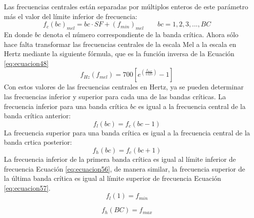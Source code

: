 \begin{enumerate}
\begin{enumerate}
\begin{equation}
\end{equation}
\newpage
Las frecuencias centrales están separadas por múltiplos enteros de este parámetro más el valor del límite inferior de frecuencia:
\begin{equation}
\label{eq:ecuacion52}
f_{c}(bc)_{mel} = bc \cdot SF + \left ( f_{min} \right )_{mel}
\qquad
bc = 1,2,3,...,BC
\end{equation}
En donde $bc$ denota el número correspondiente de la banda crítica. Ahora sólo hace falta transformar las frecuencias centrales de la escala Mel a la escala en Hertz mediante la siguiente fórmula, que es la función inversa de la Ecuación \eqref{eq:ecuacion48}
\begin{equation}
\label{eq:ecuacion53}
f_{Hz}(f_{mel}) = 700\left [ e^{\left ( \frac{f_{mel}}{1125} \right )} - 1 \right]
\end{equation}
Con estos valores de las frecuencias centrales en Hertz, ya se pueden determinar las frecuencias inferior y superior para cada una de las bandas críticas. La frecuencia inferior para una banda crítica $bc$ es igual a la frecuencia central de la banda crítica anterior:
\begin{equation}
\label{eq:ecuacion54}
f_{l}(bc) = f_{c}(bc - 1)
\end{equation}
La frecuencia superior para una banda crítica es igual a la frecuencia central de la banda crtica posterior:
\begin{equation}
\label{eq:ecuacion55}
f_{h}(bc) = f_{c}(bc + 1)
\end{equation}
La frecuencia inferior de la primera banda crítica es igual al límite inferior de frecuencia Ecuación \ref{eq:ecuacion56}, de manera similar, la frecuencia superior de la última banda crítica es igual al límite superior de frecuencia Ecuación \ref{eq:ecuacion57}.
\begin{equation}
\label{eq:ecuacion56}
f_{l}(1) = f_{min}
\end{equation}

\begin{equation}
\label{eq:ecuacion57}
f_{h}(BC) = f_{max}
\end{equation}


\end{enumerate}
\end{enumerate}
